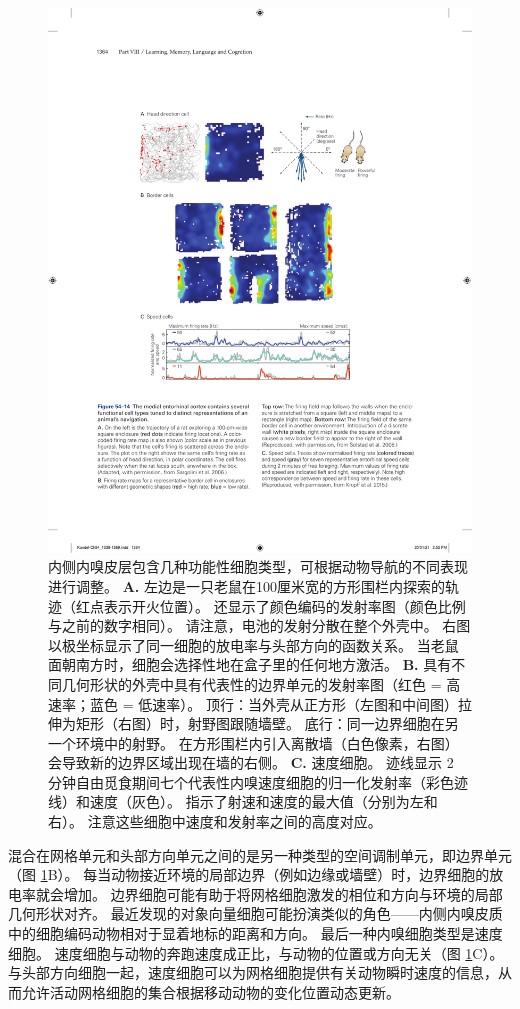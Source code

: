 \begin{figure}[htbp]
	\centering
	\includegraphics[width=0.7\linewidth]{chap54/fig_54_14}
	\caption{内侧内嗅皮层包含几种功能性细胞类型，可根据动物导航的不同表现进行调整。
		\textbf{A.} 左边是一只老鼠在100厘米宽的方形围栏内探索的轨迹（红点表示开火位置）。
		还显示了颜色编码的发射率图（颜色比例与之前的数字相同）。 请注意，电池的发射分散在整个外壳中。
		右图以极坐标显示了同一细胞的放电率与头部方向的函数关系。
		当老鼠面朝南方时，细胞会选择性地在盒子里的任何地方激活\cite{sargolini2006conjunctive}。
		\textbf{B.} 具有不同几何形状的外壳中具有代表性的边界单元的发射率图（红色 = 高速率；蓝色 = 低速率）。
		顶行：当外壳从正方形（左图和中间图）拉伸为矩形（右图）时，射野图跟随墙壁。
		底行：同一边界细胞在另一个环境中的射野。
		在方形围栏内引入离散墙（白色像素，右图）会导致新的边界区域出现在墙的右侧\cite{solstad2008representation}。
		\textbf{C.} 速度细胞。
		迹线显示 2 分钟自由觅食期间七个代表性内嗅速度细胞的归一化发射率（彩色迹线）和速度（灰色）。
		指示了射速和速度的最大值（分别为左和右）。
		注意这些细胞中速度和发射率之间的高度对应\cite{kropff2015speed}。}
	\label{fig:54_14}
\end{figure}


混合在网格单元和头部方向单元之间的是另一种类型的空间调制单元，即边界单元（图 \ref{fig:54_14}B）。
每当动物接近环境的局部边界（例如边缘或墙壁）时，边界细胞的放电率就会增加。
边界细胞可能有助于将网格细胞激发的相位和方向与环境的局部几何形状对齐。
最近发现的对象向量细胞可能扮演类似的角色——内侧内嗅皮质中的细胞编码动物相对于显着地标的距离和方向。
最后一种内嗅细胞类型是速度细胞。
速度细胞与动物的奔跑速度成正比，与动物的位置或方向无关（图 \ref{fig:54_14}C）。
与头部方向细胞一起，速度细胞可以为网格细胞提供有关动物瞬时速度的信息，从而允许活动网格细胞的集合根据移动动物的变化位置动态更新。


